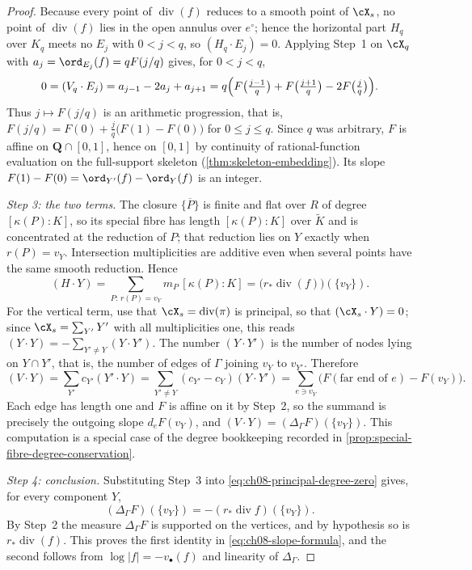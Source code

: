 \begin{proof}
Because every point of $\operatorname{div}(f)$ reduces to a smooth point of
$\cX_s$, no point of $\operatorname{div}(f)$ lies in the open annulus over
$e^\circ$; hence the horizontal part $H_q$ over $K_q$ meets no $E_j$ with
$0<j<q$, so $(H_q\cdot E_j)=0$.  Applying Step~1 on $\cX_q$ with
$a_j=\ord_{E_j}(f)=qF(j/q)$ gives, for $0<j<q$,
\[
 0=(V_q\cdot E_j)=a_{j-1}-2a_j+a_{j+1}
  =q\Bigl(F\bigl(\tfrac{j-1}q\bigr)+F\bigl(\tfrac{j+1}q\bigr)
          -2F\bigl(\tfrac jq\bigr)\Bigr).
\]
Thus $j\mapsto F(j/q)$ is an arithmetic progression, that is,
$F(j/q)=F(0)+\tfrac jq\bigl(F(1)-F(0)\bigr)$ for $0\leq j\leq q$.  Since
$q$ was arbitrary, $F$ is affine on $\mathbf Q\cap[0,1]$, hence on $[0,1]$ by
continuity of rational-function evaluation on the full-support skeleton
(\cref{thm:skeleton-embedding}).  Its slope $F(1)-F(0)=\ord_{Y'}(f)-\ord_Y(f)$ is an integer.

\emph{Step 3: the two terms.}  The closure $\overline{\{P\}}$ is finite and flat over $R$ of degree
$[\kappa(P):K]$, so its special fibre has length $[\kappa(P):K]$ over
$\widetilde K$ and is concentrated at the reduction of $P$; that reduction
lies on $Y$ exactly when $r(P)=v_Y$.  Intersection multiplicities are
additive even when several points have the same smooth reduction.  Hence
\[
 (H\cdot Y)=\sum_{P:\,r(P)=v_Y}m_P\,[\kappa(P):K]
          =\bigl(r_*\operatorname{div}(f)\bigr)(\{v_Y\}) .
\]
For the vertical term, use that $\cX_s=\operatorname{div}(\pi)$ is principal,
so that $(\cX_s\cdot Y)=0$; since $\cX_s=\sum_{Y'}Y'$ with all
multiplicities one, this reads
$(Y\cdot Y)=-\sum_{Y'\neq Y}(Y\cdot Y')$.  The number $(Y\cdot Y')$ is the
number of nodes lying on $Y\cap Y'$, that is, the number of edges of $\Gamma$
joining $v_Y$ to $v_{Y'}$.  Therefore
\[
 (V\cdot Y)=\sum_{Y'}c_{Y'}(Y'\cdot Y)
          =\sum_{Y'\neq Y}(c_{Y'}-c_Y)(Y\cdot Y')
          =\sum_{e\ni v_Y}\bigl(F(\text{far end of }e)-F(v_Y)\bigr).
\]
Each edge has length one and $F$ is affine on it by Step~2, so the summand is
precisely the outgoing slope $d_eF(v_Y)$, and
$(V\cdot Y)=(\Delta_\Gamma F)(\{v_Y\})$.  This computation is a special case
of the degree bookkeeping recorded in
\cref{prop:special-fibre-degree-conservation}.

\emph{Step 4: conclusion.}  Substituting Step~3 into
\eqref{eq:ch08-principal-degree-zero} gives, for every component $Y$,
\[
 (\Delta_\Gamma F)(\{v_Y\})
 =-(r_*\operatorname{div}f)(\{v_Y\}).
\]
By Step~2 the measure $\Delta_\Gamma F$ is supported on the
vertices, and by hypothesis so is $r_*\operatorname{div}(f)$.  This proves
the first identity in \eqref{eq:ch08-slope-formula}, and the second follows
from $\log|f|=-v_\bullet(f)$ and linearity of $\Delta_\Gamma$.
\end{proof}

